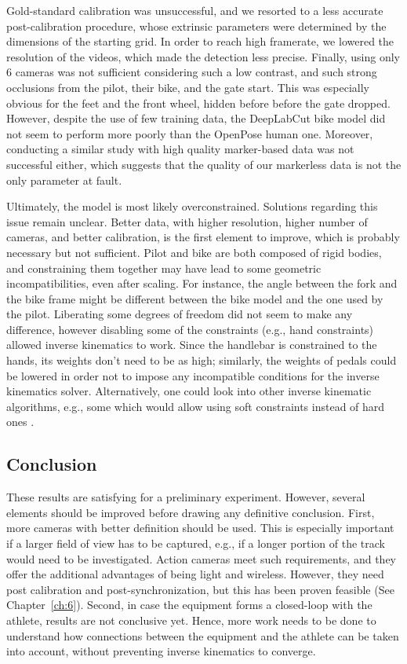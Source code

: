 Gold-standard calibration was unsuccessful, and we resorted to a less accurate post-calibration procedure, whose extrinsic parameters were determined by the dimensions of the starting grid. In order to reach high framerate, we lowered the resolution of the videos, which made the detection less precise. Finally, using only 6 cameras was not sufficient considering such a low contrast, and such strong occlusions from the pilot, their bike, and the gate start. This was especially obvious for the feet and the front wheel, hidden before before the gate dropped. However, despite the use of few training data, the DeepLabCut bike model did not seem to perform more poorly than the OpenPose human one. Moreover, conducting a similar study with high quality marker-based data was not successful either, which suggests that the quality of our markerless data is not the only parameter at fault. 

Ultimately, the model is most likely overconstrained. Solutions regarding this issue remain unclear. Better data, with higher resolution, higher number of cameras, and better calibration, is the first element to improve, which is probably necessary but not sufficient. Pilot and bike are both composed of rigid bodies, and constraining them together may have lead to some geometric incompatibilities, even after scaling. For instance, the angle between the fork and the bike frame might be different between the bike model and the one used by the pilot. Liberating some degrees of freedom did not seem to make any difference, however disabling some of the constraints (e.g., hand constraints) allowed inverse kinematics to work. Since the handlebar is constrained to the hands, its weights don't need to be as high; similarly, the weights of pedals could be lowered in order not to impose any incompatible conditions for the inverse kinematics solver. Alternatively, one could look into other inverse kinematic algorithms, e.g., some which would allow using soft constraints instead of hard ones \cite{Fohanno2014}.


\subsection{Conclusion}
These results are satisfying for a preliminary experiment. However, several elements should be improved before drawing any definitive conclusion. First, more cameras with better definition should be used. This is especially important if a larger field of view has to be captured, e.g., if a longer portion of the track would need to be investigated. Action cameras meet such requirements, and they offer the additional advantages of being light and wireless. However, they need post calibration and post-synchronization, but this has been proven feasible (See Chapter~\ref{ch:6}). Second, in case the equipment forms a closed-loop with the athlete, results are not conclusive yet. Hence, more work needs to be done to understand how connections between the equipment and the athlete can be taken into account, without preventing inverse kinematics to converge.


